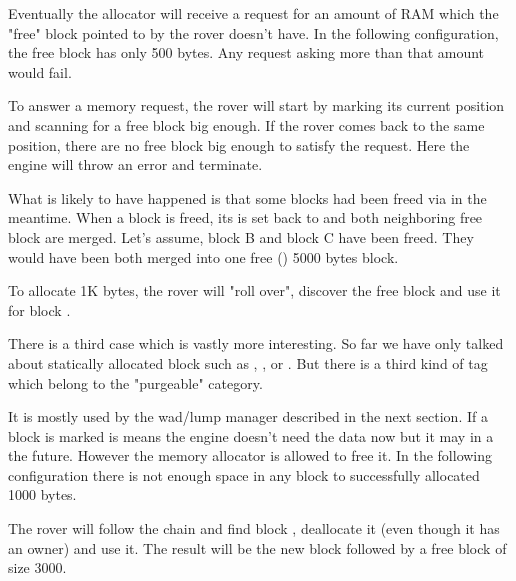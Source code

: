 Eventually the allocator will receive a request for an amount of RAM which the "free" block pointed to by the rover doesn't have. In the following configuration, the free block has only 500 bytes. Any request asking more than that amount would fail.\\
\par
{}
\par
To answer a memory request, the rover will start by marking its current position and scanning for a free block big enough. If the rover comes back to the same position, there are no free block big enough to satisfy the request. Here the engine will throw an error and terminate.\\
\par
What is likely to have happened is that some blocks had been freed via  in the meantime. When a block is freed, its  is set back to  and both neighboring free block are merged. Let's assume, block B and block C have been freed. They would have been both merged into one free () 5000 bytes block.\\
\par
{}
\par
To allocate 1K bytes, the rover will "roll over", discover the free block and use it for block .\\
\par
{}
\par
There is a third case which is vastly more interesting. So far we have only talked about statically allocated block such as , , or . But there is a third kind of tag which belong to the "purgeable" category.\\
\par
 It is mostly used by the wad/lump manager described in the next section. If a block is marked  is means the engine doesn't need the data now but it may in a the future. However the memory allocator is allowed to free it. In the following configuration there is not enough space in any block to successfully allocated 1000 bytes.\\
\par
{}
\par
The rover will follow the chain and find block , deallocate it (even though it has an owner) and use it. The result will be the new block  followed by a free block of size 3000.\\
\par
{}
\par

